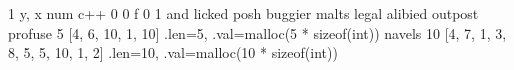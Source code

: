 \expandafter\def\csname cpp:swap\endcsname{1}
\expandafter\def\csname cpp:PARAM(x,y)\endcsname{y, x}
\expandafter\def\csname cpp:comp\endcsname{num}
\expandafter\def\csname cpp:PROCESS(c,v)\endcsname{c++}
\expandafter\def\csname cpp:INIT\endcsname{0}
\expandafter\def\csname cpp:NOT\endcsname{0}
\expandafter\def\csname cpp:COND(f,c,v)\endcsname{f}
\expandafter\def\csname cpp:FALSE\endcsname{0}
\expandafter\def\csname cpp:TRUE\endcsname{1}
\expandafter\def\csname cpp:join\endcsname{and}
\expandafter\def\csname cpp:FORALLIN\endcsname{licked}
\expandafter\def\csname cpp:A\endcsname{posh}
\expandafter\def\csname cpp:B\endcsname{buggier}
\expandafter\def\csname cpp:C\endcsname{malts}
\expandafter\def\csname cpp:I\endcsname{legal}
\expandafter\def\csname cpp:J\endcsname{alibied}
\expandafter\def\csname cpp:F\endcsname{outpost}
\expandafter\def\csname cpp:U\endcsname{profuse}
\expandafter\def\csname cpp:TABU_LEN\endcsname{5}
\expandafter\def\csname cpp:TABU_VAL\endcsname{[4, 6, 10, 1, 10]}
\expandafter\def\csname cpp:TABU\endcsname{{.len=5, .val=malloc(5 * sizeof(int))}}
\expandafter\def\csname cpp:V\endcsname{navels}
\expandafter\def\csname cpp:TABV_LEN\endcsname{10}
\expandafter\def\csname cpp:TABV_VAL\endcsname{[4, 7, 1, 3, 8, 5, 5, 10, 1, 2]}
\expandafter\def\csname cpp:TABV\endcsname{{.len=10, .val=malloc(10 * sizeof(int))}}

\def\C#1{\csname cpp:#1\endcsname}

